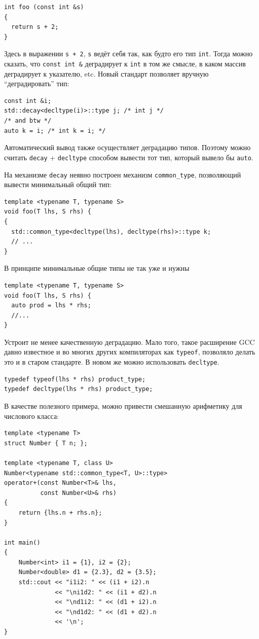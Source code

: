 \documentclass[a4paper,12pt,oneside]{article}
\begin{document}
\begin{lstlisting}
int foo (const int &s)
{
  return s + 2;
}
\end{lstlisting}

Здесь в выражении \lstinline!s + 2!, \lstinline!s! ведёт себя так, как будто его тип \lstinline!int!. Тогда можно сказать, что \lstinline!const int &! деградирует к \lstinline!int! в том же смысле, в каком массив деградирует к указателю, etc. Новый стандарт позволяет вручную ``деградировать'' тип:

\begin{lstlisting}
const int &i;
std::decay<decltype(i)>::type j; /* int j */
/* and btw */
auto k = i; /* int k = i; */
\end{lstlisting}

Автоматический вывод также осуществляет деградацию типов. Поэтому можно считать \lstinline!decay! + \lstinline!decltype! способом вывести тот тип, который вывело бы \lstinline!auto!.

На механизме \lstinline!decay! неявно построен механизм \lstinline!common_type!, позволяющий вывести минимальный общий тип:

\begin{lstlisting}
template <typename T, typename S>
void foo(T lhs, S rhs) {
{
  std::common_type<decltype(lhs), decltype(rhs)>::type k;
  // ...
}
\end{lstlisting}

В принципе минимальные общие типы не так уже и нужны

\begin{lstlisting}
template <typename T, typename S>
void foo(T lhs, S rhs) {
  auto prod = lhs * rhs;
  //...
}
\end{lstlisting}

Устроит не менее качественную деградацию. Мало того, такое расширение GCC давно известное и во многих других компиляторах как \lstinline!typeof!, позволяло делать это и в старом стандарте. В новом же можно использовать \lstinline!decltype!.

\begin{lstlisting}
typedef typeof(lhs * rhs) product_type;
typedef decltype(lhs * rhs) product_type;
\end{lstlisting}

В качестве полезного примера, можно привести смешанную арифметику для числового класса:

\begin{lstlisting}
template <typename T>
struct Number { T n; };
 
template <typename T, class U>
Number<typename std::common_type<T, U>::type> 
operator+(const Number<T>& lhs,
          const Number<U>& rhs) 
{
    return {lhs.n + rhs.n};
}
 
int main()
{
    Number<int> i1 = {1}, i2 = {2};
    Number<double> d1 = {2.3}, d2 = {3.5};
    std::cout << "i1i2: " << (i1 + i2).n 
              << "\ni1d2: " << (i1 + d2).n 
              << "\nd1i2: " << (d1 + i2).n 
              << "\nd1d2: " << (d1 + d2).n 
              << '\n';
}
\end{lstlisting}
\end{document}
